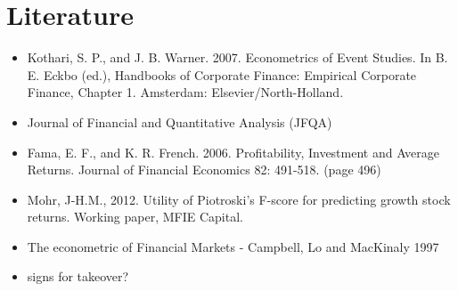 \documentclass[12pt]{article}
\begin{document}
\section{Literature}

    \begin{itemize}
        \item Kothari, S. P., and J. B. Warner. 2007. Econometrics of Event Studies. In B. E. Eckbo (ed.), Handbooks of Corporate Finance: Empirical Corporate Finance, Chapter 1. Amsterdam: Elsevier/North-Holland.
        \item Journal of Financial and Quantitative Analysis (JFQA)
        \item Fama, E. F., and K. R. French. 2006. Profitability, Investment and Average Returns. Journal of Financial Economics 82: 491-518. (page 496)
        \item Mohr, J-H.M., 2012. Utility of Piotroski's F-score for predicting growth stock returns. Working paper, MFIE Capital.
        \item The econometric of Financial Markets - Campbell, Lo and MacKinaly 1997
        \item signs for takeover? 
    \end{itemize}
\end{document}

